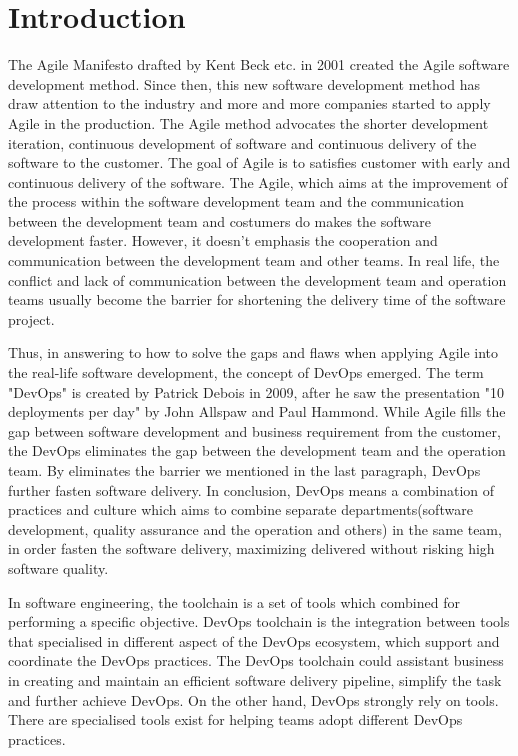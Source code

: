 \chapter{Introduction}
\label{chp:introduction}
The Agile Manifesto drafted by Kent Beck etc. in 2001 created the Agile software development method\cite{beck2001manifesto}. Since then, this new software development method has draw attention to the industry and more and more companies started to apply Agile in the production.
The Agile method advocates the shorter development iteration, continuous development of software and continuous delivery of the software to the customer. The goal of Agile is to satisfies customer with early and continuous delivery of the software.\cite{beck2001manifesto} 
The Agile, which aims at the improvement of the process within the software development team and the communication between the development team and costumers \cite{miglierina2014application} do makes the software development faster. However, it doesn't emphasis the cooperation and communication between the development team and other teams. In real life, the conflict and lack of communication between the development team and operation teams usually become the barrier for shortening the delivery time of the software project.
\par
Thus, in answering to how to solve the gaps and flaws when applying Agile into the real-life software development, the concept of DevOps emerged. The term "DevOps" is created by Patrick Debois in 2009, after he saw the presentation "10 deployments per day" by John Allspaw and Paul Hammond.\cite{kim2016devops} While Agile fills the gap between software development and business requirement from the customer, the DevOps eliminates the gap between the development team and the operation team. \cite{WhatisaD20:online} By eliminates the barrier we mentioned in the last paragraph, DevOps further fasten software delivery. In conclusion, DevOps means a combination of practices and culture which aims to combine separate departments(software development, quality assurance and the operation and others) in the same team, in order fasten the software delivery, maximizing delivered without risking high software quality. \cite{DevOpsWi87:online}\cite{ebert2016devops} 
\par
In software engineering, the toolchain is a set of tools which combined for performing a specific objective. DevOps toolchain is the integration between tools that specialised in different aspect of the DevOps ecosystem, which support and coordinate the DevOps practices. The DevOps toolchain could assistant business in creating and maintain an efficient software delivery pipeline, simplify the task and further achieve DevOps.\cite{DevOpsto7:online}\cite{Toolchai10:online} On the other hand, DevOps strongly rely on tools. There are specialised tools exist for helping teams adopt different DevOps practices\cite{zhu2016devops}.
